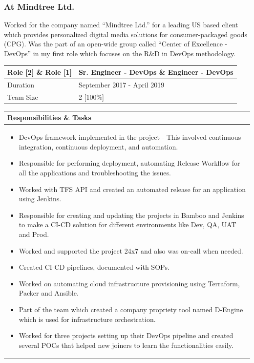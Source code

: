 \documentclass[11pt, a4paper]{article}
\begin{document}
\subsubsection*{\faBuilding\hspace{0.1pt} At Mindtree Ltd.}
Worked for the company named “Mindtree Ltd.” for a leading US based client which provides personalized digital media solutions for consumer-packaged goods (CPG).  Was the part of an open-wide group called “Center of Excellence - DevOps” in my first role which focuses on the R\&D in DevOps methodology.\\

\noindent\begin{tabular}{|p{1.5in}|p{5in}|}
\hline
\rowcolor{black!20} Role [2] \& Role [1] & Sr.  Engineer - DevOps \& Engineer - DevOps\\
\hline
Duration & September 2017 - April 2019\\
\hline
Team Size & 2 [100\%]\\
\hline
\end{tabular}
\newline
\vspace*{1mm}
\newline
\begin{tabular}{|p{6.67in}|}
\hline
\rowcolor{black!5} Responsibilities \& Tasks\\
\hline
\begin{itemize}[noitemsep, nolistsep]
\item DevOps framework implemented in the project - This involved continuous integration, continuous deployment, and automation. 
\item Responsible for performing deployment, automating Release Workflow for all the applications and troubleshooting the issues. 
\item Worked with TFS API and created an automated release for an application using Jenkins. 
\item Responsible for creating and updating the projects in Bamboo and Jenkins to make a CI-CD solution for different environments like Dev, QA, UAT and Prod. 
\item Worked and supported the project 24x7 and also was on-call when needed. 
\item Created CI-CD pipelines, documented with SOPs.
\item Worked on automating cloud infrastructure provisioning using Terraform, Packer and Ansible.
\item Part of the team which created a company propriety tool named D-Engine which is used for infrastructure orchestration.
\item Worked for three projects setting up their DevOps pipeline and created several POCs that helped new joiners to learn the functionalities easily.
\end{itemize} \\
\hline
\end{tabular}
\pagebreak
\end{document}
